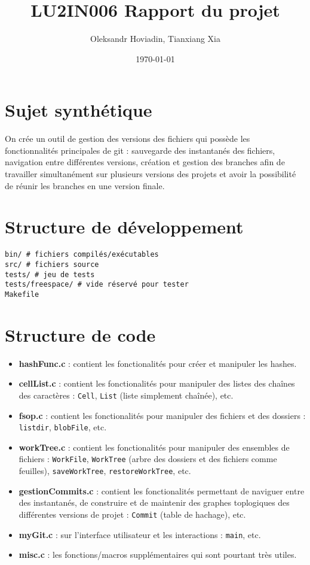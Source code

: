 \documentclass{report}
\title{LU2IN006 Rapport du projet}
\author{Oleksandr Hoviadin, Tianxiang Xia}
\date{\today}
\begin{document}
\maketitle
\section*{Sujet synthétique}
On crée un outil de gestion des versions des fichiers
qui possède les fonctionnalités principales de git : sauvegarde des instantanés
des fichiers, navigation entre différentes versions,
création et gestion des branches afin de travailler simultanément
sur plusieurs versions des projets et avoir la possibilité de réunir les branches en une version finale.

\section*{Structure de développement}

\begin{verbatim}
bin/ # fichiers compilés/exécutables
src/ # fichiers source
tests/ # jeu de tests
tests/freespace/ # vide réservé pour tester
Makefile
\end{verbatim}

\section*{Structure de code}
\begin{itemize}
    \item \textbf{hashFunc.c} : contient les fonctionalités pour créer et manipuler les hashes.
    \item \textbf{cellList.c} : contient les fonctionalités pour manipuler des listes des chaînes des caractères : \verb|Cell|, \verb|List| (liste simplement chaînée), etc.
    \item \textbf{fsop.c} : contient les fonctionalités pour manipuler des fichiers et des dossiers : \verb|listdir|, \verb|blobFile|, etc.
    \item \textbf{workTree.c} : contient les fonctionalités pour manipuler des ensembles de fichiers : \verb|WorkFile|,
    \verb|WorkTree| (arbre des dossiers et des fichiers comme feuilles),
    \verb|saveWorkTree|, \verb|restoreWorkTree|, etc.
    \item \textbf{gestionCommits.c} : contient les fonctionalités permettant de naviguer entre des instantanés, de construire
    et de maintenir des graphes toplogiques des différentes versions de projet :
    \verb|Commit| (table de hachage), etc.
    \item\textbf{myGit.c} : sur l'interface utilisateur et les interactions : \verb|main|, etc.
    \item\textbf{misc.c} : les fonctions/macros supplémentaires qui sont pourtant très utiles.
\end{itemize}
\end{document}
